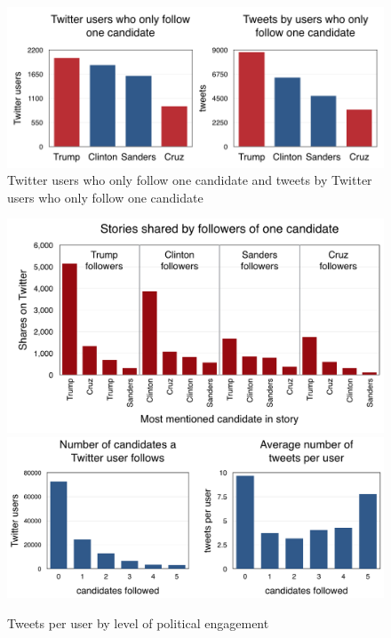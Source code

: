 \documentclass[letterpaper]{article}
\begin{document}
\begin{figure}[t!]  
\centering 
  \includegraphics[width=\columnwidth]{single-candid-charts}  
   \caption{Twitter users who only follow one candidate and tweets by Twitter users who only follow one candidate
     \label{fig:single-candid-stats}}
\end{figure} 
 
\begin{figure}[t!] 
\centering 
 \includegraphics[width=1.0\columnwidth]{who-shares-what-medium}  
  \includegraphics[width=\columnwidth]{levels-of-engagement-charts}  
  \caption{Tweets per user by level of political engagement
    \label{fig:levels-of-engagement-charts}}
\end{figure}
\end{document}

